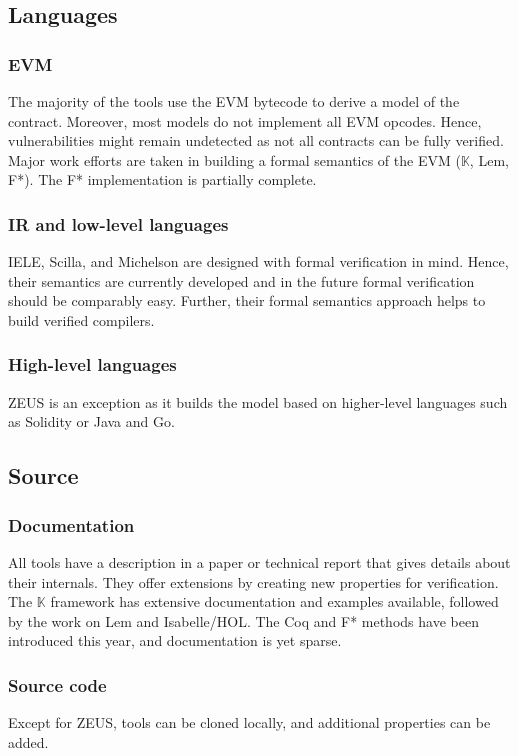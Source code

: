 \subsection{Languages} 
\subsubsection{EVM}
The majority of the tools use the EVM bytecode to derive a model of the contract. Moreover, most models do not implement all EVM opcodes. Hence, vulnerabilities might remain undetected as not all contracts can be fully verified.
Major work efforts are taken in building a formal semantics of the EVM ($\mathbb{K}$, Lem, F*). 
The F* implementation is partially complete. 

\subsubsection{IR and low-level languages}
IELE, Scilla, and Michelson are designed with formal verification in mind. 
Hence, their semantics are currently developed and in the future formal verification should be comparably easy. 
Further, their formal semantics approach helps to build verified compilers.

\subsubsection{High-level languages}
ZEUS is an exception as it builds the model based on higher-level languages such as Solidity or Java and Go. 

\subsection{Source} 
\subsubsection{Documentation}
All tools have a description in a paper or technical report that gives details about their internals. They offer extensions by creating new properties for verification.
The $\mathbb{K}$ framework has extensive documentation and examples available, followed by the work on Lem and Isabelle/HOL. The Coq and F* methods have been introduced this year, and documentation is yet sparse.

\subsubsection{Source code} Except for ZEUS, tools can be cloned locally, and additional properties can be added.
